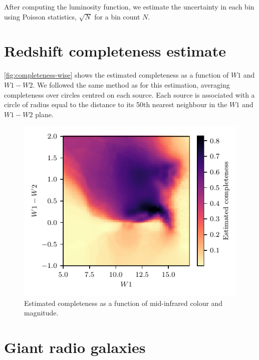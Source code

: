   After computing the luminosity function, we estimate the uncertainty in each bin using Poisson statistics, $\sqrt{N}$ for a bin count $N$.

  \section{Redshift completeness estimate}
  \label{sec:completeness}

    \autoref{fig:completeness-wise} shows the estimated completeness as a function of $W1$ and $W1-W2$. We followed the same method as \citet{pracy16rlf} for this estimation, averaging completeness over circles centred on each source. Each source is associated with a circle of radius equal to the distance to its 50th nearest neighbour in the $W1$ and $W1-W2$ plane.

    \begin{figure}
        \centering
        \includegraphics{rlf-images/completeness_wise.pdf}
        \caption{\label{fig:completeness-wise} Estimated completeness as a function of mid-infrared colour and magnitude.}
    \end{figure}

  \section{Giant radio galaxies}

